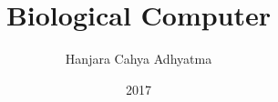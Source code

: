 \documentclass[a4paper,12pt]{book}
\begin{document}
\author{Hanjara Cahya Adhyatma}
\title{Biological Computer}
\date{2017}

\frontmatter
\maketitle
\tableofcontents

\mainmatter



\backmatter
\end{document}
